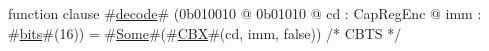 function clause #\hyperref[zdecode]{decode}# (0b010010 @ 0b01010 @ cd : CapRegEnc @ imm : #\hyperref[zbits]{bits}#(16)) = #\hyperref[zSome]{Some}#(#\hyperref[zCBX]{CBX}#(cd, imm, false)) /* CBTS */
